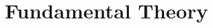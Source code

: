 \documentclass[multi,crop=false,class=article]{standalone}
\begin{document}
\section{Fundamental Theory}
\label{sec:fundamental-theory}
\end{document}

